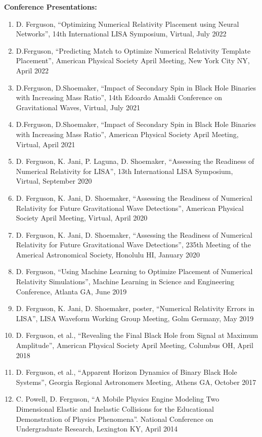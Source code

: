 \documentclass[11pt]{article}
\begin{document}
\begin{flushleft}
  \textbf{Conference Presentations:}
  \begin{enumerate}
  \item D. Ferguson, ``Optimizing Numerical Relativity Placement using Neural Networks'', 14th International LISA Symposium, Virtual, July 2022
  \item D.Ferguson, ``Predicting Match to Optimize Numerical Relativity Template Placement'', American Physical Society April Meeting, New York City NY, April 2022
  \item D.Ferguson, D.Shoemaker, ``Impact of Secondary Spin in Black Hole Binaries with Increasing Mass Ratio'', 14th Edoardo Amaldi Conference on Gravitational Waves, Virtual, July 2021
  \item D.Ferguson,  D.Shoemaker, ``Impact of Secondary Spin in Black Hole Binaries with Increasing Mass Ratio'',  American Physical Society April Meeting, Virtual, April 2021
  \item D. Ferguson, K. Jani, P. Laguna, D. Shoemaker, ``Assessing the Readiness of Numerical Relativity for LISA'', 13th International LISA Symposium, Virtual, September 2020
  \item D. Ferguson, K. Jani, D. Shoemaker, ``Assessing the Readiness of Numerical Relativity for Future Gravitational Wave Detections'', American Physical Society April Meeting, Virtual, April 2020
  \item D. Ferguson, K. Jani, D. Shoemaker, ``Assessing the Readiness of Numerical Relativity for Future Gravitational Wave Detections'', 235th Meeting of the Americal Astronomical Society, Honolulu HI, January 2020
  \item D. Ferguson, ``Using Machine Learning to Optimize Placement of Numerical Relativity Simulations'', Machine Learning in Science and Engineering Conference, Atlanta GA, June 2019
  \item D. Ferguson, K. Jani, D. Shoemaker, poster, ``Numerical Relativity Errors in LISA'', LISA Waveform Working Group Meeting, Golm Germany, May 2019
  \item D. Ferguson, et al., ``Revealing the Final Black Hole from Signal at Maximum Amplitude'', American Physical Society April Meeting, Columbus OH, April 2018
  \item D. Ferguson, et al., ``Apparent Horizon Dynamics of Binary Black Hole Systems'', Georgia Regional Astronomers Meeting, Athens GA, October 2017
  \item C. Powell, D. Ferguson, ``A Mobile Physics Engine Modeling Two Dimensional Elastic and Inelastic Collisions for the Educational Demonstration of Physics Phenomena''. National Conference on Undergraduate Research, Lexington KY, April 2014
  \end{enumerate} 


\end{flushleft}
\end{document}
